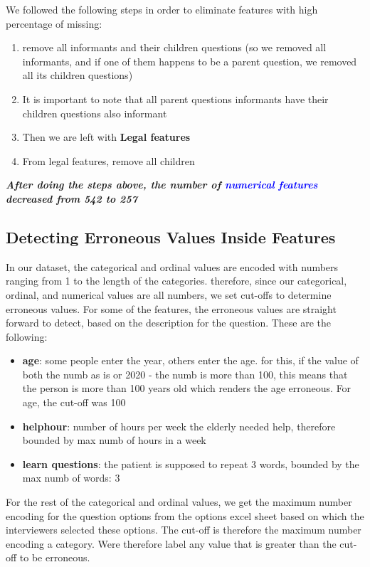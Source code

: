 \documentclass{article}
\begin{document}
We followed the following steps in order to eliminate features with high percentage of missing:
\begin{enumerate}
\item remove all informants and their children questions (so we removed all informants, and if one of them happens to be a parent question, we removed all its children questions)

\item It is important to note that all parent questions informants have their children questions also informant

\item Then we are left with \textbf{Legal features}

\item From legal features, remove all children
\end{enumerate} 

\textbf{\textit{After doing the steps above, the number of \textcolor{blue}{numerical features} decreased from 542 to 257}}

\subsection{Detecting Erroneous Values Inside Features}
\label{sec:markerrneous}
In our dataset, the categorical and ordinal values are encoded with numbers ranging from 1 to the length of the categories. therefore, since our categorical, ordinal, and numerical values are all numbers, we set cut-offs to determine erroneous values. 
For some of the features, the erroneous values are straight forward to detect, based on the description for the question. These are the following:
\begin{itemize}
    \item \textbf{age}: some people enter the year, others enter the age. for this, if the value of both the numb as is or 2020 - the numb is more than 100, this means that the person is more than 100 years old which renders the age erroneous. For age, the cut-off was 100
    \item \textbf{helphour}: number of hours per week the elderly needed help, therefore bounded by max numb of hours in a week
    \item \textbf{learn questions}: the patient is supposed to repeat 3 words, bounded by the max numb of words: 3
\end{itemize}
For the rest of the categorical and ordinal values, we get the maximum number encoding for the question options from the options excel sheet based on which the interviewers selected these options. The cut-off is therefore the maximum number encoding a category. Were therefore label any value that is greater than the cut-off to be erroneous.
\end{document}

